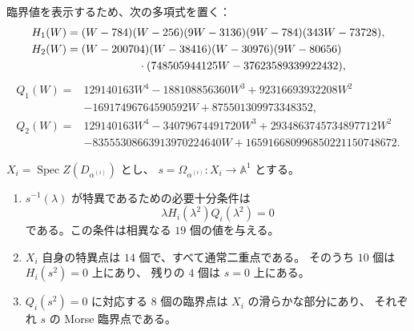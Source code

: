 臨界値を表示するため、次の多項式を置く：
\begin{align*}
 H_1(W)={}&(W-784)(W-256)(9W-3136)(9W-784)(343W-73728),\\
 H_2(W)={}&(W-200704)(W-38416)(W-30976)(9W-80656)\\
 &\hspace{18mm}\cdot(748505944125W-37623589339922432),
\end{align*}
\begin{align*}
 Q_1(W)={}&129140163W^4-188108856360W^3+92316693932208W^2\\
 &-16917496764590592W+875501309973348352,\\
 Q_2(W)={}&129140163W^4-34079674491720W^3
       +2934863745734897712W^2\\
 &-83555308663913970224640W
       +165916680996850221150748672.
\end{align*}

\begin{proposition}
\label{cmo:prop:center-critical-polynomials}
$X_i=\operatorname{Spec}Z(D_{\alpha^{(i)}})$ とし、
$s=\Omega_{\alpha^{(i)}}:X_i\to\mathbb A^1$ とする。
\begin{enumerate}
 \item $s^{-1}(\lambda)$ が特異であるための必要十分条件は
 \[
   \lambda H_i(\lambda^2)Q_i(\lambda^2)=0
 \]
 である。この条件は相異なる $19$ 個の値を与える。
 \item $X_i$ 自身の特異点は $14$ 個で、すべて通常二重点である。
 そのうち $10$ 個は $H_i(s^2)=0$ 上にあり、
 残りの $4$ 個は $s=0$ 上にある。
 \item $Q_i(s^2)=0$ に対応する $8$ 個の臨界点は $X_i$ の滑らかな部分にあり、
 それぞれ $s$ の Morse 臨界点である。
\end{enumerate}
\end{proposition}

